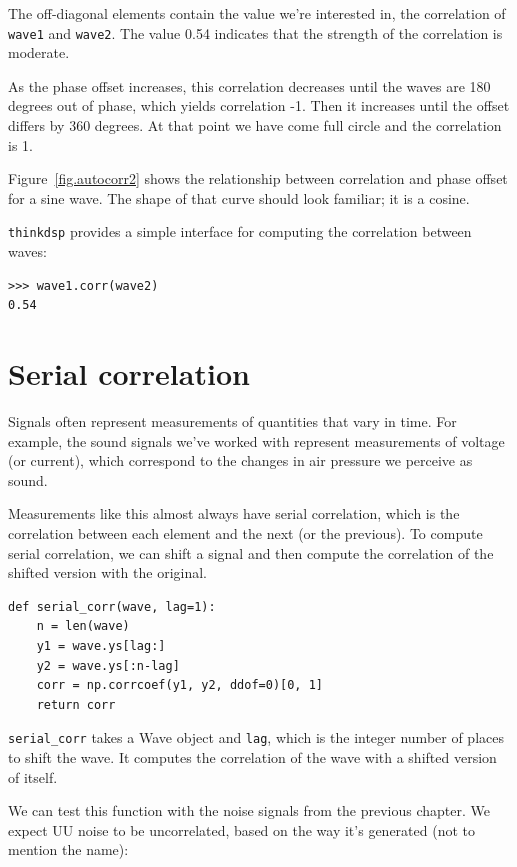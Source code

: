 \documentclass[12pt]{book}
\begin{document}
The off-diagonal elements contain the value we're interested in,
the correlation of {\tt wave1} and {\tt wave2}.  The value 0.54
indicates that the strength of the correlation is moderate.

As the phase offset increases, this correlation decreases until
the waves are 180 degrees out of phase, which yields correlation
-1.  Then it increases until the offset differs by 360 degrees.
At that point we have come full circle and the correlation is 1.

Figure~\ref{fig.autocorr2} shows the relationship between correlation and
phase offset for a sine wave.  The shape of that curve should look
familiar; it is a cosine.  

{\tt thinkdsp} provides a simple interface for computing the
correlation between waves:

\begin{verbatim}
>>> wave1.corr(wave2)
0.54
\end{verbatim}


\section{Serial correlation}

Signals often represent measurements of quantities that vary in
time.  For example, the sound signals we've worked with represent
measurements of voltage (or current), which correspond to the changes
in air pressure we perceive as sound.

Measurements like this almost always have serial correlation, which
is the correlation between each element and the next (or the previous).
To compute serial correlation, we can shift a signal and then compute
the correlation of the shifted version with the original.

\begin{verbatim}
def serial_corr(wave, lag=1):
    n = len(wave)
    y1 = wave.ys[lag:]
    y2 = wave.ys[:n-lag]
    corr = np.corrcoef(y1, y2, ddof=0)[0, 1]
    return corr
\end{verbatim}

\verb"serial_corr" takes a Wave object and
{\tt lag}, which is the integer number of places to shift the wave.
It computes the correlation of the wave with a shifted version
of itself.

We can test this function with the noise signals from the previous
chapter.  We expect UU noise to be uncorrelated, based on the
way it's generated (not to mention the name):
\end{document}
